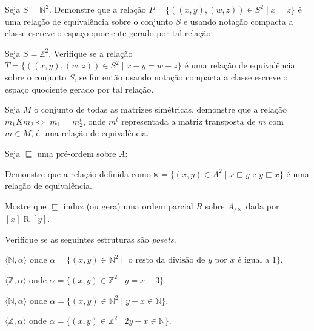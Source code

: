 \begin{questao}\label{test:EquivalenciaOrdem12}
	Seja $S = \mathbb{N}^2$. Demonstre que a relação $P = \{((x, y), (w, z)) \in S^2 \mid x = z \}$ é uma relação de equivalência sobre o conjunto $S$ e usando notação compacta a classe escreve o espaço quociente gerado por tal relação.
\end{questao}

\begin{questao}\label{test:EquivalenciaOrdem13}
	Seja $S = \mathbb{Z}^2$. Verifique se a relação $T = \{((x, y), (w, z)) \in S^2 \mid x - y = w - z \}$ é uma relação de equivalência sobre o conjunto $S$, se for então usando notação compacta a classe escreve o espaço quociente gerado por tal relação.
\end{questao}

\begin{questao}\label{test:EquivalenciaOrdem13-2}
	Seja $M$ o conjunto de todas as matrizes simétricas, demonstre que a relação $m_1 K m_2 \Longleftrightarrow$ $m_1 = m_2^t$, onde $m^t$ representada a matriz transposta de $m$ com $m \in M$, é uma relação de equivalência.
\end{questao}

\begin{questao}\label{test:EquivalenciaOrdem13-3}
	Seja $\sqsubseteq$ uma pré-ordem sobre $A$:
\end{questao}

\begin{exerList}
	\item Demonstre que a relação definida como $\ltimes = \{(x, y) \in A^2 \mid x \sqsubset y \text{ e } y \sqsubset x\}$ é uma relação de equivalência.
	\item Mostre que $\sqsubseteq$ induz (ou gera) uma ordem parcial $R$ sobre $A_{/\ltimes}$ dada por $[x] \mathrel{R} [y]$.
\end{exerList}

\begin{questao}\label{test:EquivalenciaOrdem14}
	Verifique se as seguintes estruturas são \textit{posets}.
\end{questao}

\begin{exerList}
	\item $\langle \mathbb{N}, \alpha \rangle$ onde $\alpha = \{(x, y) \in \mathbb{N}^2 \mid \text{ o resto da divisão de $y$ por $x$ é igual a } 1\}$.
	\item $\langle \mathbb{Z}, \alpha \rangle$ onde $\alpha = \{(x, y) \in \mathbb{Z}^2  \mid y = x + 3\}$.
	\item $\langle \mathbb{N}, \alpha \rangle$ onde $\alpha = \{(x, y) \in \mathbb{N}^2  \mid y - x \in \mathbb{N}\}$.
	\item $\langle \mathbb{Z}, \alpha \rangle$ onde $\alpha = \{(x, y) \in \mathbb{Z}^2  \mid 2y - x \in \mathbb{N}\}$.
\end{exerList}

